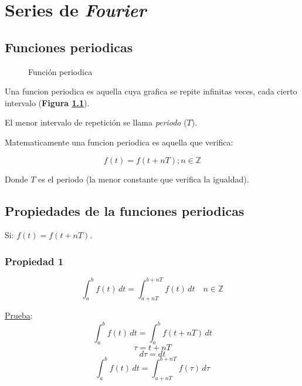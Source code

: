 \chapter{Series de \emph{Fourier}}

\section{Funciones periodicas}

\begin{figure}
    \centering
    
    \caption{Función periodica}
    \label{figura_01}
\end{figure}

Una funcion periodica es aquella cuya grafica se repite infinitas veces, cada
cierto intervalo (\textbf{Figura \ref{figura_01}}).

El menor intervalo de repetición se llama \emph{periodo} ($T$).

Matematicamente una funcion periodica es aquella que verifica:

\begin{equation}
    f(t) = f(t + nT); n \in \mathbb{Z}
\end{equation}

Donde $T$ es el periodo (la menor constante que verifica la igualdad).

\section{Propiedades de la funciones periodicas}

Si: $f(t) = f(t+nT)$.

\subsection{Propiedad 1}
\begin{equation}
    \int_a^b f(t)\,dt = \int_{a+nT}^{b+nT} f(t)\,dt \quad n \in \mathbb{Z}
\end{equation}

\underline{Prueba}:
\begin{equation*}
    \int_a^b f(t)\,dt = \int_{a}^{b} f(t+nT)\,dt
\end{equation*}
\begin{equation*}
    \tau = t + nT
\end{equation*}
\begin{equation*}
    d\tau = dt
\end{equation*}
\begin{equation*}
    \int_a^b f(t)\,dt = \int_{a+nT}^{b+nT} f(\tau)\,d\tau
\end{equation*}

